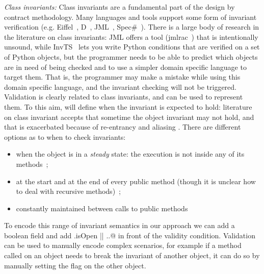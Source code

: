 \noindent\textit{Class invariants:}
Class invariants are a fundamental part of the design by contract methodology. 
Many languages and tools support some form of invariant verification (e.g. Eiffel~\cite{Meyer:1992:EL:129093}, D~\cite{Alexandrescu:2010:DPL:1875434}, JML~\cite{Burdy2005}, Spec\#~\cite{Barnett:2004:SPS:2131546.2131549}).
There is a large body of research in the literature on class invariants:
JML offers a tool (jmlrac~\cite{Burdy2005}) that is intentionally unsound,
while InvTS~\cite{gorbovitski08efficient} lets you write Python conditions
 that are verified on a set of Python objects, but the programmer needs to be able
 to predict which objects are in need of being checked and to use a simpler domain
 specific language to target them. That is, the programmer may make a mistake
while using this domain specific language, and the invariant checking
will not be triggered.
Validation is clearly related to class invariants, and can be used to represent them.
To this aim, \validate will define when the invariant is expected to hold:
literature on class invariant accepts that sometime the object invariant may not hold,
and that is exacerbated because of re-entrancy and aliasing
\cite{leino2004object,drossopoulou2008unified}.
There are different options as to when to check invariants:
\begin{itemize}
\item  when the object is in a \textit{steady} state:
 the execution is not inside any of its methods~\cite{Gopinathan:2008:RMO:1483018.1483028};
\item
at the start and at the end of every public method
(though it is unclear how to deal with recursive methods)~\cite{Burdy2005};
\item
constantly maintained between calls to public methods~\cite{WikiInvariant}
\end{itemize}
To encode this range of invariant semantics
in our approach we can add a boolean \Q@isOpen@ field and add \Q@this.isOpen || ..@
in front of the validity condition.
Validation can be used to manually encode complex scenarios,
for example if a method called on an object needs to break the invariant of another object,
it can do so by manually setting the \Q@isOpen@ flag on the other object.



